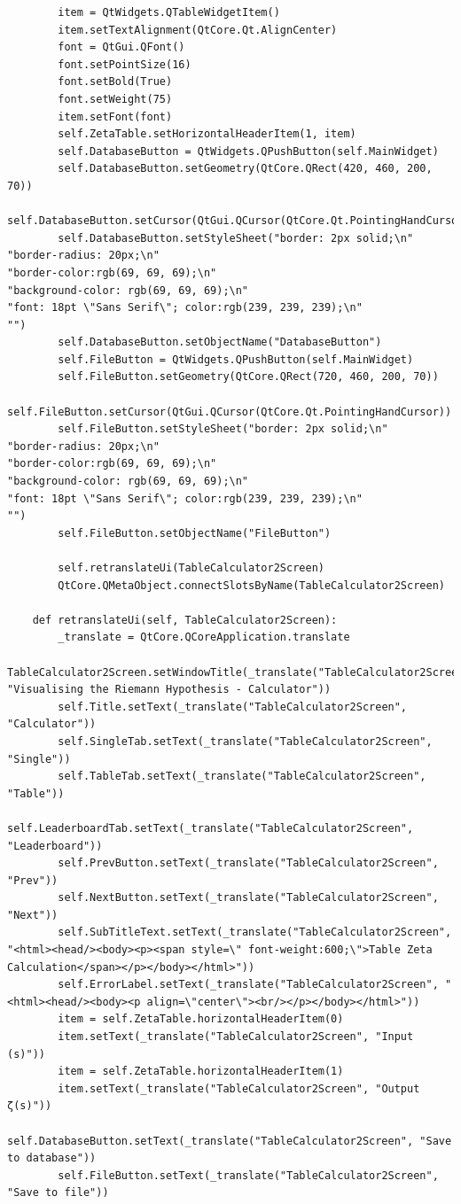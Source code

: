 \documentclass[12pt]{article}
\begin{document}
\begin{lstlisting}
        item = QtWidgets.QTableWidgetItem()
        item.setTextAlignment(QtCore.Qt.AlignCenter)
        font = QtGui.QFont()
        font.setPointSize(16)
        font.setBold(True)
        font.setWeight(75)
        item.setFont(font)
        self.ZetaTable.setHorizontalHeaderItem(1, item)
        self.DatabaseButton = QtWidgets.QPushButton(self.MainWidget)
        self.DatabaseButton.setGeometry(QtCore.QRect(420, 460, 200, 70))
        self.DatabaseButton.setCursor(QtGui.QCursor(QtCore.Qt.PointingHandCursor))
        self.DatabaseButton.setStyleSheet("border: 2px solid;\n"
"border-radius: 20px;\n"
"border-color:rgb(69, 69, 69);\n"
"background-color: rgb(69, 69, 69);\n"
"font: 18pt \"Sans Serif\"; color:rgb(239, 239, 239);\n"
"")
        self.DatabaseButton.setObjectName("DatabaseButton")
        self.FileButton = QtWidgets.QPushButton(self.MainWidget)
        self.FileButton.setGeometry(QtCore.QRect(720, 460, 200, 70))
        self.FileButton.setCursor(QtGui.QCursor(QtCore.Qt.PointingHandCursor))
        self.FileButton.setStyleSheet("border: 2px solid;\n"
"border-radius: 20px;\n"
"border-color:rgb(69, 69, 69);\n"
"background-color: rgb(69, 69, 69);\n"
"font: 18pt \"Sans Serif\"; color:rgb(239, 239, 239);\n"
"")
        self.FileButton.setObjectName("FileButton")

        self.retranslateUi(TableCalculator2Screen)
        QtCore.QMetaObject.connectSlotsByName(TableCalculator2Screen)

    def retranslateUi(self, TableCalculator2Screen):
        _translate = QtCore.QCoreApplication.translate
        TableCalculator2Screen.setWindowTitle(_translate("TableCalculator2Screen", "Visualising the Riemann Hypothesis - Calculator"))
        self.Title.setText(_translate("TableCalculator2Screen", "Calculator"))
        self.SingleTab.setText(_translate("TableCalculator2Screen", "Single"))
        self.TableTab.setText(_translate("TableCalculator2Screen", "Table"))
        self.LeaderboardTab.setText(_translate("TableCalculator2Screen", "Leaderboard"))
        self.PrevButton.setText(_translate("TableCalculator2Screen", "Prev"))
        self.NextButton.setText(_translate("TableCalculator2Screen", "Next"))
        self.SubTitleText.setText(_translate("TableCalculator2Screen", "<html><head/><body><p><span style=\" font-weight:600;\">Table Zeta Calculation</span></p></body></html>"))
        self.ErrorLabel.setText(_translate("TableCalculator2Screen", "<html><head/><body><p align=\"center\"><br/></p></body></html>"))
        item = self.ZetaTable.horizontalHeaderItem(0)
        item.setText(_translate("TableCalculator2Screen", "Input (s)"))
        item = self.ZetaTable.horizontalHeaderItem(1)
        item.setText(_translate("TableCalculator2Screen", "Output ζ(s)"))
        self.DatabaseButton.setText(_translate("TableCalculator2Screen", "Save to database"))
        self.FileButton.setText(_translate("TableCalculator2Screen", "Save to file"))
\end{lstlisting}
\end{document}
